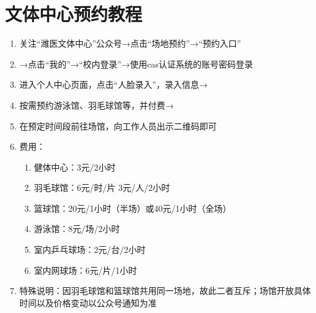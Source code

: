 \section[文体中心预约教程]{文体中心预约教程}
\label{sports_center_book}
\begin{enumerate}
      \item 关注“潍医文体中心”公众号→点击“场地预约”→“预约入口”
      \item →点击“我的”→“校内登录”→使用cas认证系统的账号密码登录
      \item 进入个人中心页面，点击“人脸录入”，录入信息→
      \item 按需预约游泳馆、羽毛球馆等，并付费→
      \item 在预定时间段\footnotemark 前往场馆，向工作人员出示二维码即可
      \item 费用：
            \begin{enumerate}
                  \item 健体中心：3元/2小时
                  \item 羽毛球馆\footnotemark：6元/时/片 3元/人/2小时
                  \item 篮球馆：20元/1小时（半场）或40元/1小时（全场）
                  \item 游泳馆\footnotemark：8元/场/2小时
                  \item 室内乒乓球场：2元/台/2小时
                  \item 室内网球场：6元/片/1小时
            \end{enumerate}
      \item 特殊说明：因羽毛球馆和篮球馆共用同一场地，故此二者互斥；场馆开放具体时间以及价格变动以公众号通知为准
\end{enumerate}
